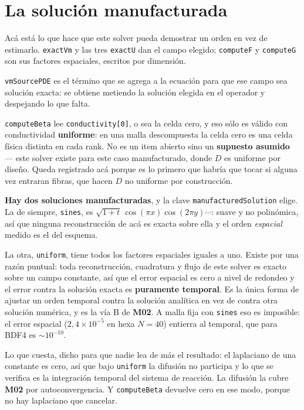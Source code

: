 \documentclass[11pt,a4paper]{article}
\begin{document}
\section{La solución manufacturada}

Acá está lo que hace que este solver pueda demostrar un orden en vez de
estimarlo. \texttt{exactVm} y las tres \texttt{exactU} dan el campo elegido;
\texttt{computeF} y \texttt{computeG} son sus factores espaciales, escritos por
dimensión.

\texttt{vmSourcePDE} es el término que se agrega a la ecuación para que ese campo
sea solución exacta: se obtiene metiendo la solución elegida en el operador y
despejando lo que falta.

\texttt{computeBeta} lee \texttt{conductivity[0]}, o sea la celda cero, y eso
sólo es válido con conductividad \textbf{uniforme}: en una malla descompuesta la
celda cero es una celda física distinta en cada rank. No es un item abierto sino
un \textbf{supuesto asumido} --- este solver existe para este caso manufacturado,
donde $D$ es uniforme por diseño. Queda registrado acá porque es lo primero que
habría que tocar si alguna vez entraran fibras, que hacen $D$ no uniforme por
construcción.

\textbf{Hay dos soluciones manufacturadas}, y la clave
\texttt{manufacturedSolution} elige. La de siempre, \texttt{sines}, es
$\sqrt{1+t}\,\cos(\pi x)\cos(2\pi y)\cdots$: suave y no polinómica, así que
ninguna reconstrucción de acá es exacta sobre ella y el orden \emph{espacial}
medido es el del esquema.

La otra, \texttt{uniform}, tiene todos los factores espaciales iguales a uno.
Existe por una razón puntual: toda reconstrucción, cuadratura y flujo de este
solver es exacto sobre un campo constante, así que el error espacial es cero a
nivel de redondeo y el error contra la solución exacta es \textbf{puramente
temporal}. Es la única forma de ajustar un orden temporal contra la solución
analítica en vez de contra otra solución numérica, y es la vía B de \textbf{M02}.
A malla fija con \texttt{sines} eso es imposible: el error espacial
($2{,}4\times10^{-5}$ en hexa $N=40$) entierra al temporal, que para BDF4 es
$\sim10^{-10}$.

Lo que cuesta, dicho para que nadie lea de más el resultado: el laplaciano de una
constante es cero, así que bajo \texttt{uniform} la difusión no participa y lo
que se verifica es la integración temporal del sistema de reacción. La difusión
la cubre \textbf{M02} por autoconvergencia. Y \texttt{computeBeta} devuelve cero
en ese modo, porque no hay laplaciano que cancelar.
\end{document}
